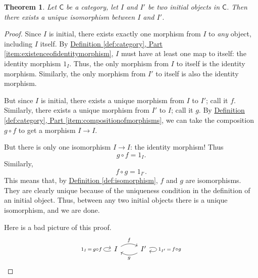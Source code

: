 \documentclass[a4paper]{report}
\theoremstyle{definition}
\theoremstyle{plain}
\newtheorem{theorem}{Theorem}[section]
\theoremstyle{remark}
\begin{document}
\begin{theorem}
  Let $\mathsf{C}$ be a category, let $I$ and $I'$ be two initial objects in $\mathsf{C}$. Then there exists a unique isomorphism between $I$ and $I'$.
  \label{thm:allinitialobjectsareuniquelyisomorphic}
\end{theorem}
\begin{proof}
  Since $I$ is initial, there exists exactly one morphism from $I$ to \emph{any} object, including $I$ itself. By \hyperref[item:existenceofidentitymorphism]{Definition \ref*{def:category}, Part \ref*{item:existenceofidentitymorphism}}, $I$ must have at least one map to itself: the identity morphism $1_{I}$. Thus, the only morphism from $I$ to itself is the identity morphism. Similarly, the only morphism from $I'$ to itself is also the identity morphism.

  But since $I$ is initial, there exists a unique morphism from $I$ to $I'$; call it $f$. Similarly, there exists a unique morphism from $I'$ to $I$; call it $g$. By \hyperref[item:compositionofmorphisms]{Definition \ref*{def:category}, Part \ref*{item:compositionofmorphisms}}, we can take the composition $g \circ f$ to get a morphism $I \to I$.

  But there is only one isomorphism $I \to I$: the identity morphism! Thus
  \begin{equation*}
    g \circ f = 1_{I}.
  \end{equation*}
  Similarly, 
  \begin{equation*}
    f \circ g  = 1_{I'}.
  \end{equation*}
  This means that, by \hyperref[def:isomorphism]{Definition \ref*{def:isomorphism}}, $f$ and $g$ are isomorphisms. They are clearly unique because of the uniqueness condition in the definition of an initial object. Thus, between any two initial objects there is a unique isomorphism, and we are done.

  Here is a bad picture of this proof.
  \begin{equation*}
    \begin{tikzcd}
      I \arrow[loop left, "1_{I} \,=\, g \circ f"] \arrow[r, bend left, "f"] & I' \arrow[l, bend left, "g"] \arrow[loop right, "1_{I'} \,=\, f \circ g"]
    \end{tikzcd}
  \end{equation*}
\end{proof}
\end{document}
